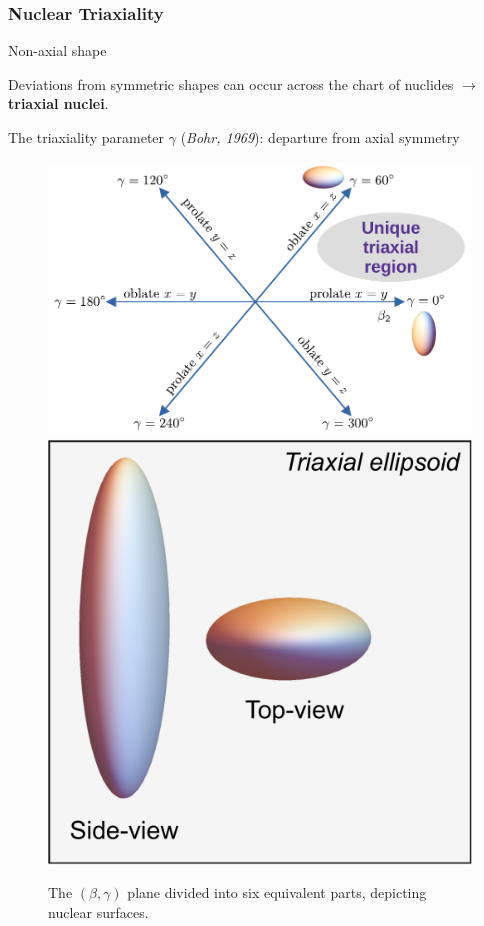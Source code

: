\documentclass{beamer}
\begin{document}
\begin{frame}
  \frametitle{Nuclear Triaxiality}
  \begin{alertblock}{Non-axial shape}
    \par Deviations from symmetric shapes can occur across the chart of nuclides $\to$ \textbf{triaxial nuclei}.
    \par The triaxiality parameter $\gamma$ (\textit{Bohr, 1969}): departure from axial symmetry
  \end{alertblock}
  \begin{figure}
    \centering
    \includegraphics[scale=0.3]{Figs/nice_diagram.pdf}
    \includegraphics[scale=0.14]{Figs/triaxial-shape.pdf}
    \caption{The $(\beta,\gamma)$ plane divided into six equivalent parts, depicting nuclear surfaces.}
  \end{figure}
\end{frame}
\end{document}
